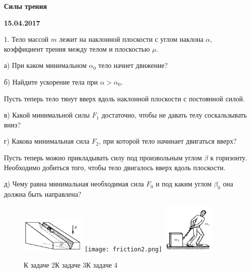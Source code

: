 \documentclass[14pt]{article}
\begin{document}
\begin{center}
\Large{\textbf{Силы трения}}

\textbf{15.04.2017}
\end{center}
\vspace{5mm}

1. Тело массой $m$ лежит на наклонной плоскости с углом наклона $\alpha$, коэффициент трения между телом и плоскостью $\mu$.

а) При каком минимальном $\alpha_0$ тело начнет движение?

б) Найдите ускорение тела при $\alpha>\alpha_0$.

Пусть теперь тело тянут вверх вдоль наклонной плоскости с постоянной силой.

в) Какой минимальной силы $F_1$ достаточно, чтобы не давать телу соскальзывать вниз?

г) Какова минимальная сила $F_2$, при которой тело начинает двигаться вверх?

Пусть теперь можно прикладывать силу под произвольным углом $\beta$ к горизонту. Необходимо добиться того, чтобы тело двигалось вверх вдоль плоскости.

д) Чему равна минимальная необходимая сила $F_0$ и под каким углом $\beta_0$ она должна быть направлена?

\begin{figure}[h]
\begin{center}
\includegraphics[width=0.28\textwidth]{friction1.png}
\hspace{1cm}
\texttt{[image: friction2.png]}
\hspace{1cm}
\includegraphics[width=0.23\textwidth]{friction3.png}
\caption{\hspace{0.5cm}К задаче 2\hspace{3cm}К задаче 3\hspace{2.5cm}К задаче 4}
\end{center}
\end{figure}
\end{document}

